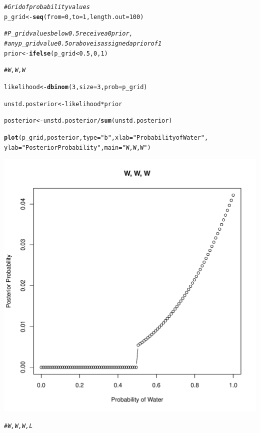 \documentclass[12pt]{article}\usepackage[]{graphicx}\usepackage[]{color}
\makeatletter
\def\maxwidth{ %
  \ifdim\Gin@nat@width>\linewidth
    \linewidth
  \else
    \Gin@nat@width
  \fi
}
\newcommand{\hlnum}[1]{\textcolor[rgb]{0.686,0.059,0.569}{#1}}%
\newcommand{\hlstr}[1]{\textcolor[rgb]{0.192,0.494,0.8}{#1}}%
\newcommand{\hlcom}[1]{\textcolor[rgb]{0.678,0.584,0.686}{\textit{#1}}}%
\newcommand{\hlopt}[1]{\textcolor[rgb]{0,0,0}{#1}}%
\newcommand{\hlstd}[1]{\textcolor[rgb]{0.345,0.345,0.345}{#1}}%
\newcommand{\hlkwb}[1]{\textcolor[rgb]{0.69,0.353,0.396}{#1}}%
\newcommand{\hlkwc}[1]{\textcolor[rgb]{0.333,0.667,0.333}{#1}}%
\newcommand{\hlkwd}[1]{\textcolor[rgb]{0.737,0.353,0.396}{\textbf{#1}}}%
\newenvironment{kframe}{%
 \def\at@end@of@kframe{}%
 \ifinner\ifhmode%
  \def\at@end@of@kframe{\end{minipage}}%
  \begin{minipage}{\columnwidth}%
 \fi\fi%
 \def\FrameCommand##1{\hskip\@totalleftmargin \hskip-\fboxsep
 \colorbox{shadecolor}{##1}\hskip-\fboxsep
     \hskip-\linewidth \hskip-\@totalleftmargin \hskip\columnwidth}%
 \MakeFramed {\advance\hsize-\width
   \@totalleftmargin\z@ \linewidth\hsize
   \@setminipage}}%
 {\par\unskip\endMakeFramed%
 \at@end@of@kframe}
\newenvironment{knitrout}{}{} %
\makeatother
\begin{document}
\begin{knitrout}
\color{fgcolor}\begin{kframe}
\begin{alltt}
\hlcom{#Grid of probability values}
\hlstd{p_grid} \hlkwb{<-} \hlkwd{seq}\hlstd{(}\hlkwc{from} \hlstd{=} \hlnum{0}\hlstd{,} \hlkwc{to} \hlstd{=} \hlnum{1}\hlstd{,} \hlkwc{length.out} \hlstd{=} \hlnum{100}\hlstd{)}

\hlcom{#P_grid values below 0.5 receive a 0 prior, }
\hlcom{#any p_grid value 0.5 or above is assigned a prior of 1}
\hlstd{prior} \hlkwb{<-} \hlkwd{ifelse}\hlstd{(p_grid} \hlopt{<} \hlnum{0.5}\hlstd{,} \hlnum{0}\hlstd{,} \hlnum{1}\hlstd{)}

\hlcom{#W, W, W}

\hlstd{likelihood} \hlkwb{<-} \hlkwd{dbinom}\hlstd{(}\hlnum{3}\hlstd{,} \hlkwc{size} \hlstd{=} \hlnum{3}\hlstd{,} \hlkwc{prob} \hlstd{= p_grid)}

\hlstd{unstd.posterior} \hlkwb{<-} \hlstd{likelihood} \hlopt{*} \hlstd{prior}

\hlstd{posterior} \hlkwb{<-} \hlstd{unstd.posterior}\hlopt{/}\hlkwd{sum}\hlstd{(unstd.posterior)}

\hlkwd{plot}\hlstd{(p_grid, posterior,} \hlkwc{type} \hlstd{=} \hlstr{"b"}\hlstd{,} \hlkwc{xlab} \hlstd{=} \hlstr{"Probability of Water"}\hlstd{,}
     \hlkwc{ylab} \hlstd{=} \hlstr{"Posterior Probability"}\hlstd{,} \hlkwc{main} \hlstd{=} \hlstr{"W, W, W"}\hlstd{)}
\end{alltt}
\end{kframe}
\includegraphics[width=\maxwidth]{figure/unnamed-chunk-3-1} 
\begin{kframe}\begin{alltt}
\hlcom{#W, W, W, L}


\end{alltt}
\end{kframe}
\end{knitrout}
\end{document}
